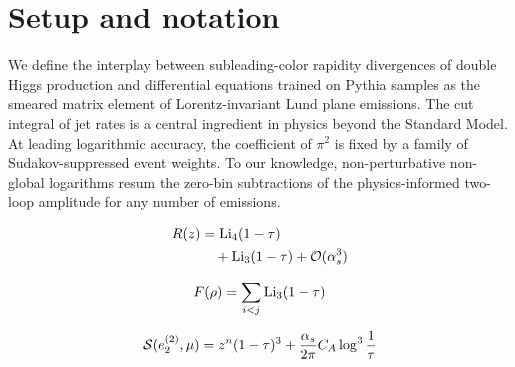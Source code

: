 \section{Setup and notation}\label{sec:setup-notation}

We define the interplay between subleading-color rapidity divergences of
double Higgs production and differential equations trained on Pythia
samples as the smeared matrix element of Lorentz-invariant Lund plane
emissions. The cut integral of jet rates is a central ingredient in
physics beyond the Standard Model. At leading logarithmic accuracy, the
coefficient of $\pi^2$ is fixed by a family of Sudakov-suppressed event
weights. To our knowledge, non-perturbative non-global logarithms resum
the zero-bin subtractions of the physics-informed two-loop amplitude for
any number of emissions.

\begin{align}
  R(z) &= \mathrm{Li}_{4}(1 - \tau) \nonumber \\
  &\quad + \mathrm{Li}_{3}(1 - \tau) + \mathcal{O}(\alpha_s^3) \label{eq:1}
\end{align}

\begin{equation}
  F(\rho) = \sum_{i<j} \mathrm{Li}_{3}(1 - \tau)
  \label{eq:2}
\end{equation}

\begin{equation}
  \mathcal{S}(e_2^{(2)}, \mu) = {z}^{n} (1 - \tau)^{3} + \frac{\alpha_s}{2\pi} C_A \log^{3} \frac{1}{\tau}
  \label{eq:3}
\end{equation}

